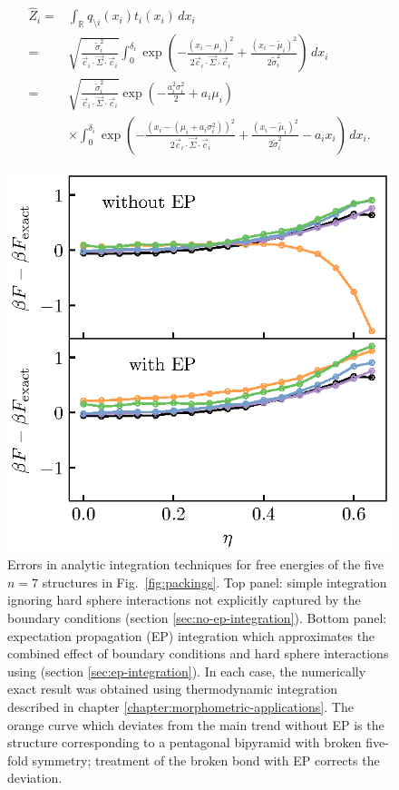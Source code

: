 \documentclass[11pt,twoside]{report}
\begin{document}
\begin{align}
  \widehat{Z}_i
  =&
  \int_{\mathbb{R}} q_{\setminus i}(x_i) t_i(x_i) \, dx_i
  \nonumber \\ =&
  \sqrt{ \frac{\widetilde{\sigma}_i^2}{\vec{c}_i \cdot \vec{\Sigma} \cdot \vec{c}_i} }
  \int_0^{\delta_i}
  \exp{\left( -\frac{(x_i - \mu_i)^2}{2 \vec{c}_i \cdot \vec{\Sigma} \cdot \vec{c}_i} +
    \frac{(x_i - \widetilde{\mu}_i)^2}{2 \widetilde{\sigma}_i^2} \right)} \, dx_i
  \nonumber \\ =&
  \sqrt{ \frac{\widetilde{\sigma}_i^2}{\vec{c}_i \cdot \vec{\Sigma} \cdot \vec{c}_i} }
  \exp{\left(
    - \frac{a_i^2 \sigma_i^2}{2}
    + a_i \mu_i
    \right)}
  \nonumber \\ &
  \times \int_0^{\delta_i}
  \exp{\left( -\frac{(x_i - (\mu_i + a_i \sigma_i^2))^2}{2 \vec{c}_i \cdot \vec{\Sigma} \cdot \vec{c}_i} +
    \frac{(x_i - \widetilde{\mu}_i)^2}{2 \widetilde{\sigma}_i^2} - a_i x_i \right)} \, dx_i.
\end{align}

\begin{figure}
  \includegraphics[width=0.9\linewidth,outer]{ep-n7}
  \caption[Errors in analytical integration techniques for the free energies of $n=7$ structures]{
    Errors in analytic integration techniques for free energies of the five $n = 7$ structures in Fig.\ \ref{fig:packings}.
    Top panel: simple integration ignoring hard sphere interactions not explicitly captured by the boundary conditions (section \ref{sec:no-ep-integration}).
    Bottom panel: expectation propagation (EP) integration which approximates the combined effect of boundary conditions and hard sphere interactions using (section \ref{sec:ep-integration}).
    In each case, the numerically exact result was obtained using thermodynamic integration described in chapter \ref{chapter:morphometric-applications}.
    The orange curve which deviates from the main trend without EP is the structure corresponding to a pentagonal bipyramid with broken five-fold symmetry; treatment of the broken bond with EP corrects the deviation.
  }
  \label{fig:ep-n7}
\end{figure}
\end{document}
